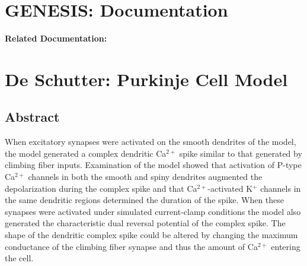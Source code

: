 \documentclass[12pt]{article}
\begin{document}
\section*{GENESIS: Documentation}

{\bf Related Documentation:}

\section*{De Schutter: Purkinje Cell Model}

\subsection*{Abstract}

When excitatory synapses were activated on the smooth
dendrites of the model, the model generated a complex dendritic
Ca$^{2+}$ spike similar to that generated by climbing fiber inputs. Examination
of the model showed that activation of P-type Ca$^{2+}$
channels in both the smooth and spiny dendrites augmented the
depolarization during the complex spike and that Ca$^{2+}$-activated
K$^+$ channels in the same dendritic regions determined the duration
of the spike. When these synapses were activated under simulated
current-clamp conditions the model also generated the characteristic
dual reversal potential of the complex spike. The shape
of the dendritic complex spike could be altered by changing the
maximum conductance of the climbing fiber synapse and thus the
amount of Ca$^{2+}$ entering the cell.
\end{document}
